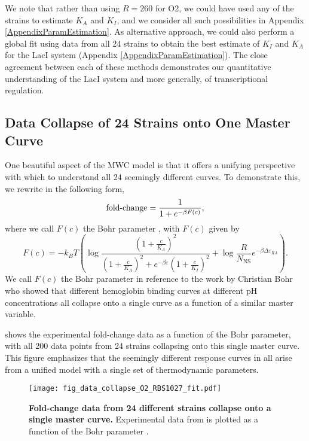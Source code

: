 We note that rather than using $R=260$ for O2, we could have used any of the strains to estimate $K_A$ and $K_I$, and we consider all such possibilities in Appendix \ref{AppendixParamEstimation}. As alternative approach, we could also perform a global fit using data from all 24 strains to obtain the best estimate of $K_I$ and $K_A$ for the LacI system (Appendix \ref{AppendixParamEstimation}). The close agreement between each of these methods demonstrates our quantitative understanding of the LacI system and more generally, of transcriptional regulation.


\subsection*{Data Collapse of 24 Strains onto One Master Curve}

One beautiful aspect of the MWC model is that it offers a unifying perspective with which to understand all 24 seemingly different curves. To demonstrate this, we rewrite \eref[eq7] in the following form,
\begin{equation}\label{eq8}
\operatorname{fold-change}= \frac{1}{1+e^{-\beta F(c)}} ,
\end{equation}
where we call $F(c)$ the Bohr parameter \cite{Phillips2016}, with $F(c)$ given by
\begin{equation}\label{eq10}
F(c) = - k_B T \left( \log \frac{\left(1+\frac{c}{K_A}\right)^2}{\left(1+\frac{c}{K_A}\right)^2+e^{-\beta  \varepsilon }\left(1+\frac{c}{K_I}\right)^2} + \log \frac{R}{N_{\text{NS}}} e^{- \beta \Delta\varepsilon_{RA}} \right).
\end{equation}
We call $F(c)$ the Bohr parameter in reference to the work by Christian Bohr who showed that different hemoglobin binding curves at different pH concentrations all collapse onto a single curve as a function of a similar master variable.

 shows the experimental fold-change data as a function of the Bohr parameter, with all 200 data points from 24 strains collapsing onto this single master curve. This figure emphasizes that the seemingly different response curves in  all arise from a unified model with a single set of thermodynamic parameters.

\begin{figure}[h]
	\centering \texttt{[image: fig\_data\_collapse\_O2\_RBS1027\_fit.pdf]}
	\caption{{\bf Fold-change data from 24 different strains collapse onto a single master curve.} Experimental data from  is plotted as a function of the Bohr parameter \eref[eq10].} \label{fig_result3}
\end{figure}
